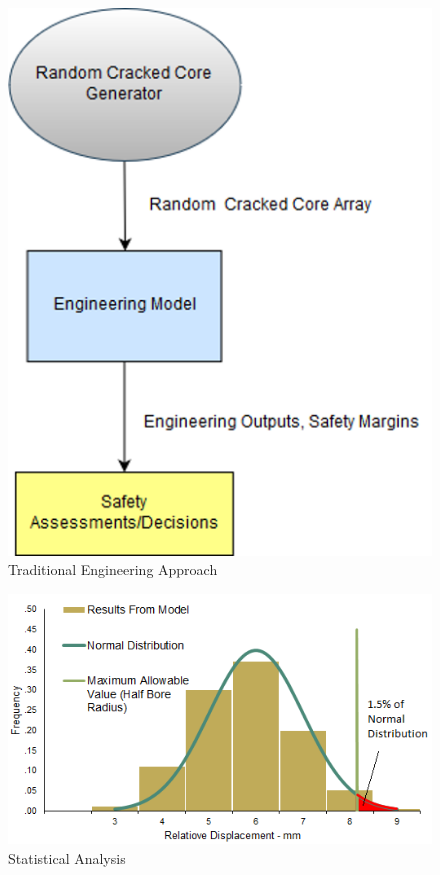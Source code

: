 \begin{figure}[b!]
	\centering
	\includegraphics[scale=0.5]{Figures/engineering_approach}
	\caption{Traditional Engineering Approach}
	\label{fig:traditional}
\end{figure}

\begin{figure}[t]
	\centering
	\includegraphics[scale=0.55]{Figures/Statistical_analysis}
	\caption{Statistical Analysis}
	\label{fig:statistical_analysis}
\end{figure}




